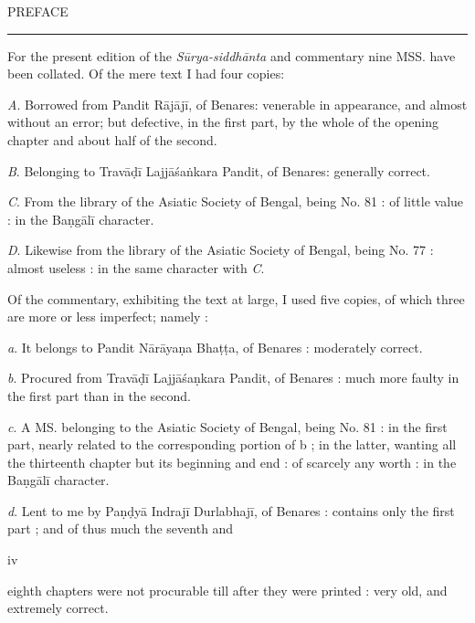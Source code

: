\documentclass[11pt, openany]{book}
\begin{document}
\newpage


\begin{center}
PREFACE

\rule{4em}{.5pt}
\end{center}
\vspace{0.6cm}

 For the present edition of the  {\textenglish{\emph{Sūrya-siddhānta}}} and commentary nine MSS. have been collated. Of the mere text I had four copies:

{\textenglish{\emph{A}}}. Borrowed from Pandit Rājājī, of Benares: venerable in appearance, and almost without an error; but defective, in the first part, by the whole of the opening chapter and about half of the second.

 {\textenglish{\emph{B}}}. Belonging to Travāḍī Lajjāśaṅkara Pandit, of Benares: generally correct.

 {\textenglish{\emph{C}}}. From the library of the Asiatic Society of Bengal, being No. 81 : of little value : in the Ba\d{n}gālī character.

{\textenglish{\emph{D}}}. Likewise from the library of the Asiatic Society of Bengal, being No. 77 : almost useless : in the same character
with {\textenglish{\emph{C}}}.

 Of the commentary, exhibiting the text at large, I used five
copies, of which three are more or less imperfect; namely :

{\textenglish{\emph{a}}}. It belongs to Pandit Nārāyaṇa Bhaṭṭa, of Benares : moderately correct.

 {\textenglish{\emph{b}}}. Procured from Travāḍī Lajjāśa\d{n}kara Pandit, of Benares : much more faulty in the first part than in the second.

{\textenglish{\emph{c}}}. A MS. belonging to the Asiatic Society of Bengal, being No. 81 : in the first part, nearly related to the corresponding portion of b ; in the latter, wanting all the thirteenth chapter but its beginning and end : of scarcely any worth : in the Ba\d{n}gālī character.

 {\textenglish{\emph{d}}}. Lent to me by Paṇḍyā Indrajī Durlabhajī, of Benares : contains only the first part ; and of thus much the seventh and

\newpage


\begin{center}
 iv
\end{center}


\noindent eighth chapters were not procurable till after they were printed : very old, and extremely correct. 
\end{document}
